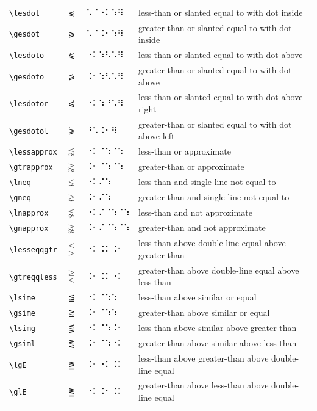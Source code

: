 \documentclass[oneside]{article}
\begin{document}
\begin{longtable}{llll}
\verb|\lesdot| & $\lesdot$ &   ⠡⠈⠐⠅⠱⠻   & {less-than or slanted equal to with dot inside} \\[2ex]
\verb|\gesdot| & $\gesdot$ &   ⠡⠈⠨⠂⠱⠻   & {greater-than or slanted equal to with dot inside} \\[2ex]
\verb|\lesdoto| & $\lesdoto$ &   ⠐⠅⠱⠣⠡⠻   & {less-than or slanted equal to with dot above} \\[2ex]
\verb|\gesdoto| & $\gesdoto$ &   ⠨⠂⠱⠣⠡⠻   & {greater-than or slanted equal to with dot above} \\[2ex]
\verb|\lesdotor| & $\lesdotor$ &   ⠐⠅⠱⠘⠡⠻   & {less-than or slanted equal to with dot above right} \\[2ex]
\verb|\gesdotol| & $\gesdotol$ &   ⠘⠡⠨⠂⠻   & {greater-than or slanted equal to with dot above left} \\[2ex]
\verb|\lessapprox| & $\lessapprox$ &   ⠐⠅⠈⠱⠈⠱   & {less-than or approximate} \\[2ex]
\verb|\gtrapprox| & $\gtrapprox$ &   ⠨⠂⠈⠱⠈⠱   & {greater-than or approximate} \\[2ex]
\verb|\lneq| & $\lneq$ &   ⠐⠅⠌⠱   & {less-than and single-line not equal to} \\[2ex]
\verb|\gneq| & $\gneq$ &   ⠨⠂⠌⠱   & {greater-than and single-line not equal to} \\[2ex]
\verb|\lnapprox| & $\lnapprox$ &   ⠐⠅⠌⠈⠱⠈⠱   & {less-than and not approximate} \\[2ex]
\verb|\gnapprox| & $\gnapprox$ &   ⠨⠂⠌⠈⠱⠈⠱   & {greater-than and not approximate} \\[2ex]
\verb|\lesseqqgtr| & $\lesseqqgtr$ &   ⠐⠅⠨⠅⠨⠂   & {less-than above double-line equal above greater-than} \\[2ex]
\verb|\gtreqqless| & $\gtreqqless$ &   ⠨⠂⠨⠅⠐⠅   & {greater-than above double-line equal above less-than} \\[2ex]
\verb|\lsime| & $\lsime$ &   ⠐⠅⠈⠱⠱   & {less-than above similar or equal} \\[2ex]
\verb|\gsime| & $\gsime$ &   ⠨⠂⠈⠱⠱   & {greater-than above similar or equal} \\[2ex]
\verb|\lsimg| & $\lsimg$ &   ⠐⠅⠈⠱⠨⠂   & {less-than above similar above greater-than} \\[2ex]
\verb|\gsiml| & $\gsiml$ &   ⠨⠂⠈⠱⠐⠅   & {greater-than above similar above less-than} \\[2ex]
\verb|\lgE| & $\lgE$ &   ⠨⠂⠐⠅⠨⠅   & {less-than above greater-than above double-line equal} \\[2ex]
\verb|\glE| & $\glE$ &   ⠐⠅⠨⠂⠨⠅   & {greater-than above less-than above double-line equal} \\[2ex]

\end{longtable}
\end{document}
